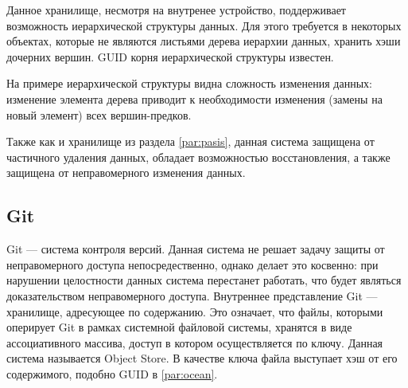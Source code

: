 Данное хранилище, несмотря на внутренее устройство, поддерживает возможность иерархической структуры данных. Для этого требуется в некоторых объектах, которые не являются листьями дерева иерархии данных, хранить хэши дочерних вершин. GUID корня иерархической структуры известен.

На примере иерархической структуры видна сложность изменения данных: изменение элемента дерева приводит к необходимости изменения (замены на новый элемент) всех вершин-предков.

Также как и хранилище из раздела \ref{par:pasis}, данная система защищена от частичного удаления данных, обладает возможностью восстановления, а также защищена от неправомерного изменения данных.

\subsection{Git}

Git\cite{git} --- система контроля версий. Данная система не решает задачу защиты от неправомерного доступа непосредественно, однако делает это косвенно: при нарушении целостности данных система перестанет работать, что будет являться доказательством неправомерного доступа. Внутреннее представление Git --- хранилище, адресующее по содержанию. Это означает, что файлы, которыми оперирует Git в рамках системной файловой системы, хранятся в виде ассоциативного массива, доступ в котором осуществляется по ключу. Данная система называется Object Store. В качестве ключа файла выступает хэш от его содержимого, подобно GUID в \ref{par:ocean}.

